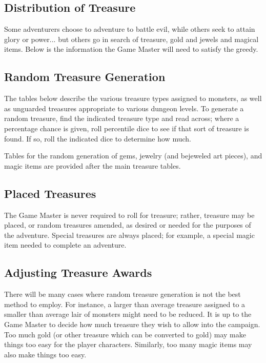\documentclass[a4paper,twoside,openany,10pt]{book}
\begin{document}
\begin{multicols}{2}

\subsection{Distribution of Treasure}\label{distribution-of-treasure}

Some adventurers choose to adventure to battle evil, while others seek to attain glory or power... but others go in search of treasure, gold and jewels and magical items. Below is the information the Game Master will need to satisfy the greedy.

\subsection{Random Treasure Generation}\label{random-treasure-generation}

The tables below describe the various treasure types assigned to monsters, as well as unguarded treasures appropriate to various dungeon levels. To generate a random treasure, find the indicated treasure type and read across; where a percentage chance  is given, roll percentile dice to see if that sort of treasure is found. If so, roll the indicated dice to determine how much.

Tables for the random generation of gems, jewelry (and bejeweled art pieces), and magic items are provided after the main treasure tables.

\subsection{Placed Treasures}\label{placed-treasures}

The Game Master is never required to roll for treasure; rather, treasure may be placed, or random treasures amended, as desired or needed for the purposes of the adventure. Special treasures are always placed; for example, a special magic item  needed to complete an adventure.

\subsection{Adjusting Treasure Awards}\label{adjusting-treasure-awards}

There will be many cases where random treasure generation is not the best method to employ. For instance, a larger than average treasure assigned to a smaller than average lair of monsters might need to be reduced. It is up to the Game Master to  decide how much treasure they wish to allow into the campaign. Too much gold (or other treasure which can be converted to gold) may make things too easy for the player characters. Similarly, too many magic items may also make things too easy.


\end{multicols}
\end{document}
